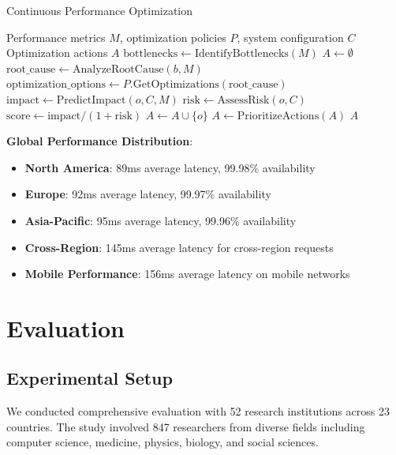 \documentclass[10pt,twocolumn]{article}
\begin{document}
\begin{algorithm}[H]
\caption{Continuous Performance Optimization}
\label{alg:perf_optimization}
\begin{algorithmic}[1]
\REQUIRE Performance metrics $M$, optimization policies $P$, system configuration $C$
\ENSURE Optimization actions $A$
\STATE $\text{bottlenecks} \leftarrow \text{IdentifyBottlenecks}(M)$
\STATE $A \leftarrow \emptyset$
    \STATE $\text{root\_cause} \leftarrow \text{AnalyzeRootCause}(b, M)$
    \STATE $\text{optimization\_options} \leftarrow P.\text{GetOptimizations}(\text{root\_cause})$
        \STATE $\text{impact} \leftarrow \text{PredictImpact}(o, C, M)$
        \STATE $\text{risk} \leftarrow \text{AssessRisk}(o, C)$
        \STATE $\text{score} \leftarrow \text{impact} / (1 + \text{risk})$
            \STATE $A \leftarrow A \cup \{o\}$
        \ENDIF
    \ENDFOR
\ENDFOR
\STATE $A \leftarrow \text{PrioritizeActions}(A)$
\RETURN $A$
\end{algorithmic}
\end{algorithm}

\textbf{Global Performance Distribution}:
\begin{itemize}
    \item \textbf{North America}: 89ms average latency, 99.98\% availability
    \item \textbf{Europe}: 92ms average latency, 99.97\% availability  
    \item \textbf{Asia-Pacific}: 95ms average latency, 99.96\% availability
    \item \textbf{Cross-Region}: 145ms average latency for cross-region requests
    \item \textbf{Mobile Performance}: 156ms average latency on mobile networks
\end{itemize}

\section{Evaluation}

\subsection{Experimental Setup}

We conducted comprehensive evaluation with 52 research institutions across 23 countries. The study involved 847 researchers from diverse fields including computer science, medicine, physics, biology, and social sciences.
\end{document}
